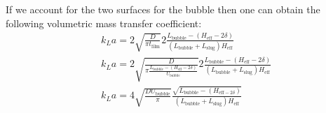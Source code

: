 \documentclass{article}
\begin{document}
\begin{description}
If we account for the two surfaces for the bubble then one can obtain the following volumetric mass
transfer coefficient:
\begin{equation}
\begin{aligned}
&k_L a= 2\sqrt{\frac{D}{\pi t_{\mathrm{film}}}} 2
\frac{L_{\mathrm{bubble}}-(H_{\mathrm{eff}}-2\delta)}{(L_{\mathrm{bubble}}+L_{
\mathrm { slug } } )H_ { \mathrm { eff } } }\\
&k_L a= 2\sqrt{\frac{D}{\pi
\frac{L_{\mathrm{bubble}}-(H_{\mathrm{eff}}-2\delta)}{U_{\mathrm{bubble}}}}} 2
\frac{L_{\mathrm{bubble}}-(H_{\mathrm{eff}}-2\delta)}{(L_{\mathrm{bubble}}+L_{
\mathrm { slug } } )H_ { \mathrm { eff } } }\\
&k_L a=4 \sqrt{\frac{D U_{\mathrm{bubble}}}{\pi}}
\frac{\sqrt{L_{\mathrm{bubble}}-(H_{\mathrm{eff}-2\delta})}}{(L_{\mathrm{bubble}}+L_{\mathrm{slug}}
)H_ { \mathrm { eff } } }
\end{aligned}
\end{equation}


\end{description}
\end{document}
